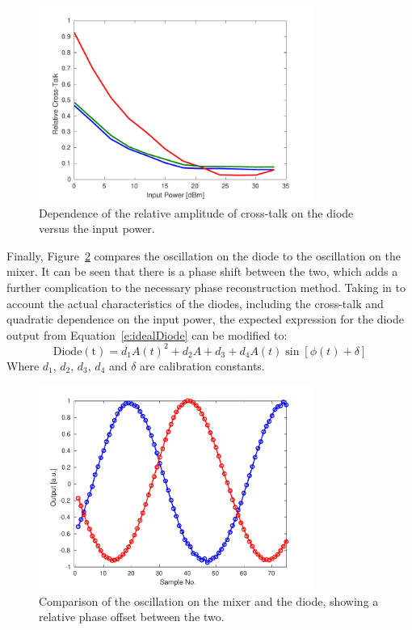 \begin{figure}
  \centering
  \includegraphics[width=0.8\textwidth]{Figures/phaseMons/RelativeDiodeXTalkVsPower}
  \caption{Dependence of the relative amplitude of cross-talk on the diode versus the input power.}
  \label{f:RelativeDiodeXTalkVsPower}
\end{figure}

Finally, Figure~\ref{f:PhaseDiodeVsMixer} compares the oscillation on the diode to the oscillation on the mixer. It can be seen that there is a phase shift between the two, which adds a further complication to the necessary phase reconstruction method. Taking in to account the actual characteristics of the diodes, including the cross-talk and quadratic dependence on the input power, the expected expression for the diode output from Equation~\ref{e:idealDiode} can be modified to:
\begin{equation}
\mathrm{Diode(t)} = d_1A(t)^2 + d_2A + d_3 + d_4A(t)\sin[\phi(t)+\delta]
\label{e:actualDiodeResponse}
\end{equation}
Where \(d_1\), \(d_2\), \(d_3\), \(d_4\) and \(\delta\) are calibration constants.

\begin{figure}
  \centering
  \includegraphics[width=0.8\textwidth]{Figures/phaseMons/PhaseDiodeVsMixer}
  \caption{Comparison of the oscillation on the mixer and the diode, showing a relative phase offset between the two.}
  \label{f:PhaseDiodeVsMixer}
\end{figure}

